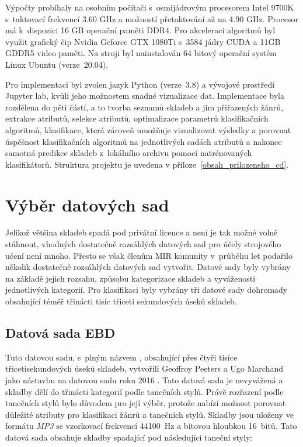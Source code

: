 Výpočty probíhaly na osobním počítači s~osmijádrovým procesorem Intel 9700K s~taktovací frekvencí 3.60 GHz a možností přetaktování až na 4.90 GHz. Procesor má k~dispozici 16 GB operační paměti DDR4. Pro akceleraci algoritmů byl využit grafický čip Nvidia Geforce GTX 1080Ti s~3584 jádry CUDA a 11GB GDDR5 video paměti. Na stroji byl nainstalován 64 bitový operační systém Linux Ubuntu (verze~20.04).

Pro implementaci byl zvolen jazyk Python (verze~3.8) a vývojové prostředí Jupyter lab, kvůli jeho možnostem snadné vizualizace dat. Implementace byla rozdělena do pěti částí, a to tvorba seznamů skladeb a jim přiřazených žánrů, extrakce atributů, selekce atributů, optimalizace parametrů klasifikačních algoritmů, klasifikace, která zároveň umožňuje vizualizovat výsledky a porovnat úspěšnost klasifikačních algoritmů na jednotlivých sadách atributů a nakonec samotná predikce skladeb z~lokálního archivu pomocí natrénovaných klasifikátorů. Struktura projektu je uvedena v příloze~\ref{obsah_prilozeneho_cd}.

\section{Výběr datových sad}
Jelikož většina skladeb spadá pod privátní licence a není je tak možné volně stáhnout, vhodných dostatečně rozsáhlých datových sad pro účely strojového učení není mnoho. Přesto se však členům MIR komunity v~průběhu let podařilo několik dostatečně rozsáhlých datových sad vytvořit. Datové sady byly vybrány na základě jejich rozsahu, způsobu kategorizace skladeb a vyváženosti jednotlivých kategorií. Pro klasifikaci byly vybrány tři datové sady dohromady obsahující téměř třinácti tisíc třiceti sekundových úseků skladeb.

\subsection*{Datová sada EBD}
Tuto datovou sadu, s~plným názvem , obsahující přes čtyři tisíce třicetisekundových úseků skladeb, vytvořili Geoffroy Peeters a Ugo Marchand jako nástavbu na datovou sadu  roku 2016 \cite{ebd}. Tato datová sada je nevyvážená a skladby dělí do třinácti kategorií podle tanečních stylů. Právě rozřazení podle tanečních stylů bylo důvodem pro její výběr, protože nabízí možnost porovnat důležité atributy pro klasifikaci žánrů a tanečních stylů. Skladby jsou uloženy ve formátu \textit{MP3} se vzorkovací frekvencí 44100~Hz a bitovou hloubkou 16~bitů. Tato datová sada obsahuje skladby spadající pod následující taneční styly:

